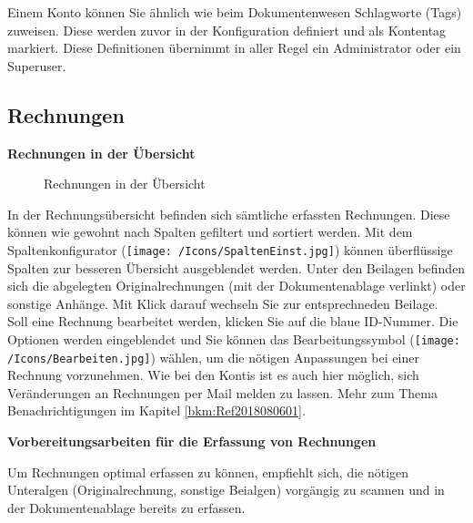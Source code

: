 Einem Konto können Sie ähnlich wie beim Dokumentenwesen Schlagworte (Tags) zuweisen. Diese werden zuvor in der Konfiguration definiert und als Kontentag markiert. Diese Definitionen übernimmt in aller Regel ein Administrator oder ein Superuser.

\subsection{Rechnungen}

\textbf{Rechnungen in der Übersicht}

\begin{figure}[H]
\caption{Rechnungen in der Übersicht}
\end{figure}

In der Rechnungsübersicht befinden sich sämtliche erfassten Rechnungen. Diese können wie gewohnt nach Spalten gefiltert und sortiert werden. Mit dem Spaltenkonfigurator (\texttt{[image: /Icons/SpaltenEinst.jpg]}) können überflüssige Spalten zur besseren Übersicht ausgeblendet werden. Unter den Beilagen befinden sich die abgelegten Originalrechnungen (mit der Dokumentenablage verlinkt) oder sonstige Anhänge. Mit Klick darauf wechseln Sie zur entsprechneden Beilage.\\
Soll eine Rechnung bearbeitet werden, klicken Sie auf die blaue ID-Nummer. Die Optionen werden eingeblendet und Sie können das Bearbeitungssymbol (\texttt{[image: /Icons/Bearbeiten.jpg]}) wählen, um die nötigen Anpassungen bei einer Rechnung vorzunehmen. Wie bei den Kontis ist es auch hier möglich, sich Veränderungen an Rechnungen per Mail melden zu lassen. Mehr zum Thema Benachrichtigungen im Kapitel \ref{bkm:Ref2018080601}.

\vspace{\baselineskip}

\textbf{Vorbereitungsarbeiten für die Erfassung von Rechnungen}

\vspace{\baselineskip}

Um Rechnungen optimal erfassen zu können, empfiehlt sich, die nötigen Unteralgen (Originalrechnung, sonstige Beialgen) vorgängig zu scannen und in der Dokumentenablage bereits zu erfassen.

